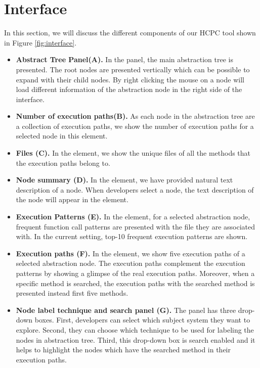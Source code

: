 \section{Interface}
\label{hla3:interface}
In this section, we will discuss the different components of our HCPC tool shown in Figure \ref{fig:interface}.

\begin{itemize}
    \item \textbf{Abstract Tree Panel(A).} In the panel, the main abstraction tree is presented. The root nodes are presented vertically which can be possible to expand with their child nodes. By right clicking the mouse on a node will load different information of the abstraction node in the right side of the interface.
    \item \textbf{Number of execution paths(B).} As each node in the abstraction tree are a collection of execution paths, we show the number of execution paths for a selected node in this element.
    \item \textbf{Files (C).} In the element, we show the unique files of all the methods that the execution paths belong to.
    \item \textbf{Node summary (D).} In the element, we have provided natural text description of a node. When developers select a node, the text description of the node will appear in the element. 
    \item \textbf{Execution Patterns (E).} In the element, for a selected abstraction node, frequent function call patterns are presented with the file they are associated with. In the current setting, top-10 frequent execution patterns are shown. 
    
    \item \textbf{Execution paths (F).} In the element, we show five execution paths of a selected abstraction node. The execution paths complement the execution patterns by showing a glimpse of the real execution paths. Moreover, when a specific method is searched, the execution paths with the searched method is presented instead first five methods.
    
    \item \textbf{ Node label technique and search panel (G).} The panel has three drop-down boxes. First, developers can select which subject system they want to explore. Second, they can choose which technique to be used for labeling the nodes in abstraction tree. Third, this drop-down box is search enabled and it helps to highlight the nodes which have the searched method in their execution paths.
\end{itemize}

